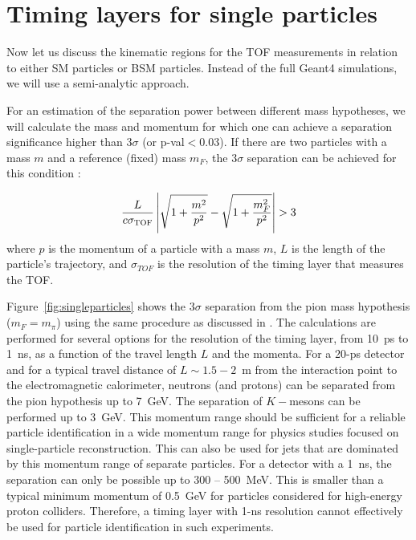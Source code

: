 \section{Timing layers for single particles}

Now let us discuss the kinematic regions for the TOF measurements in relation to
either SM particles or BSM particles. Instead of the full Geant4 simulations, we will
use a semi-analytic approach.  
 
For an estimation of the separation power between different mass hypotheses, we will
calculate the mass and momentum for which one can achieve a separation significance higher than $3\sigma$ (or p-val$<0.03$). 
If there are two particles with a mass $m$ and a reference (fixed) mass $m_F$, the $3\sigma$ separation can be 
achieved for this condition  \cite{Cerri:2018rkm}:

\begin{equation}
\frac{L}{c \sigma_{\textsc{TOF}}}\left|\sqrt{1+\frac{m^2}{p^2}} - \sqrt{1+\frac{m_F^2}{p^2}}\right| > 3
\label{eqTOF}
\end{equation}
where $p$ is the momentum of a particle with a mass $m$, $L$  is the length of the particle's trajectory, 
and $\sigma_{TOF}$ is the
resolution  of the timing layer that measures the TOF.

Figure~\ref{fig:singleparticles} shows the $3\sigma$ separation from the pion
mass hypothesis ($m_F=m_{\pi}$) using the same procedure as discussed  in \cite{Cerri:2018rkm}. The 
calculations are performed for several options for the resolution of the timing layer, from 10~ps to 1~ns,
as a function of the travel length $L$ and the momenta. For a 20-ps detector and  for a typical travel 
distance of $L\sim 1.5-2$~m from the interaction point to the 
electromagnetic calorimeter, neutrons (and protons) can be separated from the pion hypothesis up to 7~GeV. 
The separation of $K-$mesons can be performed up to 3~GeV.
This momentum range should be sufficient for a reliable particle identification in a wide momentum range 
for physics studies focused on single-particle reconstruction. This can also be used for jets that are dominated
by this momentum range of separate particles.
For a detector  with a 1~ns, the separation can only be possible  up to  300 -- 500~MeV. This is smaller than a typical
minimum momentum of 0.5~GeV for particles considered for high-energy proton colliders.
Therefore, a timing layer with 1-ns resolution cannot effectively be used for particle identification in such experiments.

